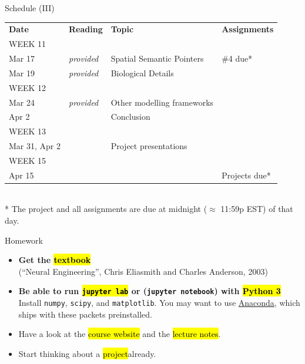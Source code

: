 \documentclass[aspectratio=169]{beamer}
\begin{document}
\begin{frame}{Schedule (III)}
	\small
	\begin{tabular}{p{2cm} p{2cm} p{5cm} p{3cm}}
		\toprule
		\textbf{Date} &	\textbf{Reading} &	\textbf{Topic} & \textbf{Assignments} \\
		\tiny WEEK 11 & & & \\
		Mar 17 &
		\emph{provided} &
		Spatial Semantic Pointers &
		\#4 due*\\
		Mar 19 &
		\emph{provided} &
		Biological Details &
		\\[0.05cm]
		
		\tiny WEEK 12 & & & \\
		Mar 24 &
		\emph{provided} &
		Other modelling frameworks &
		\\
		Apr 2 &
		&
		Conclusion &
		\\[0.05cm]
		
		\tiny WEEK 13 & & & \\
		Mar 31, Apr 2 &
		&
		Project presentations &
		\\[0.05cm]
		
		\tiny WEEK 15 & & & \\
		Apr 15 &
		&
		&
		Projects due* \\
		\bottomrule
	\end{tabular}\\[0.2cm]
	\footnotesize
	* The project and all assignments are due at midnight ($\approx$ 11:59p EST) of that day.
\end{frame}

\begin{frame}{Homework}
	\begin{itemize}
		\setlength{\itemsep}{0.5cm}
		\item \textbf{Get the \hl{textbook}}\\
		(\enquote{Neural Engineering}, Chris Eliasmith and Charles Anderson, 2003)
		\item \textbf{Be able to run \hl{\texttt{jupyter lab}} or (\texttt{jupyter notebook}) with \hl{Python 3}}\\
		Install \texttt{numpy}, \texttt{scipy}, and \texttt{matplotlib}. You may want to use \href{https://www.anaconda.com/distribution/}{Anaconda}, which ships with these packets preinstalled.
		\item Have a look at the \hl{course website} and the \hl{lecture notes}.
		\item Start thinking about a \hl{project}\textellipsis already.
	\end{itemize}
\end{frame}
\end{document}
